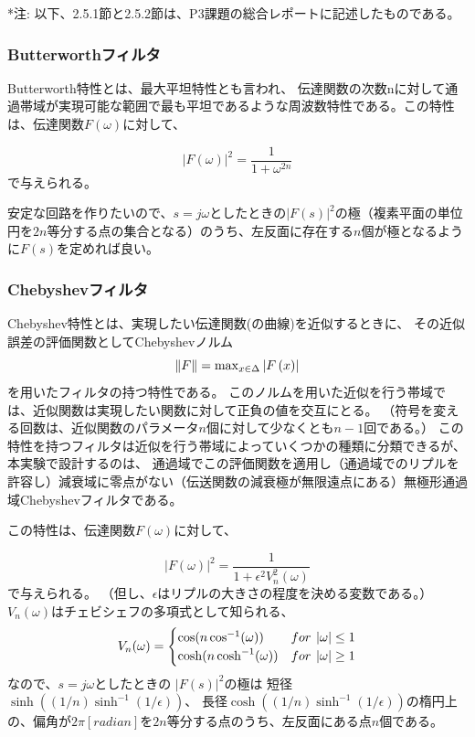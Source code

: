 \documentclass[10pt,a4j,dvipdfmx]{jsarticle}
\begin{document}
*注: 以下、2.5.1節と2.5.2節は、P3課題の総合レポートに記述したものである。
\subsubsection{Butterworthフィルタ}
Butterworth特性とは、最大平坦特性とも言われ、
伝達関数の次数nに対して通過帯域が実現可能な範囲で最も平坦であるような周波数特性である。この特性は、伝達関数$F(\omega)$に対して、

\begin{equation}
|F(\omega)|^{2} = \frac{1}{1+\omega^{2n}}
\end{equation}
で与えられる。

安定な回路を作りたいので、$s = j\omega$としたときの$|F(s)|^{2}$の極（複素平面の単位円を$2n$等分する点の集合となる）のうち、左反面に存在する$n$個が極となるように$F(s)$を定めれば良い。

\subsubsection{Chebyshevフィルタ}
Chebyshev特性とは、実現したい伝達関数(の曲線)を近似するときに、
その近似誤差の評価関数としてChebyshevノルム
\begin{equation}
\|F\| = {\rm max}_{x \in \Delta} \left|F\left( x \right)\right|
\end{equation}
を用いたフィルタの持つ特性である。
このノルムを用いた近似を行う帯域では、近似関数は実現したい関数に対して正負の値を交互にとる。
（符号を変える回数は、近似関数のパラメータ$n$個に対して少なくとも$n-1$回である。）
この特性を持つフィルタは近似を行う帯域によっていくつかの種類に分類できるが、
本実験で設計するのは、
通過域でこの評価関数を適用し（通過域でのリプルを許容し）減衰域に零点がない（伝送関数の減衰極が無限遠点にある）無極形通過域Chebyshevフィルタである。

この特性は、伝達関数$F(\omega)$に対して、

\begin{equation}
|F(\omega)|^{2} = \frac{1}{1+\epsilon^{2}V_{n}^{2}(\omega)}
\end{equation}
で与えられる。
（但し、$\epsilon$はリプルの大きさの程度を決める変数である。）	
$V_{n}(\omega)$はチェビシェフの多項式として知られる、
\begin{equation}
  V_{n}(\omega) = 
  \begin{cases}
    \cos(n\cos^{-1} (\omega)) & {\rm} for\hspace{4pt}|\omega|\leq 1 \\
    \cosh(n \cosh^{-1} (\omega)) & {\rm}  for\hspace{4pt}|\omega|\geq 1
  \end{cases}
\end{equation}
なので、$s = j\omega$としたときの
$|F(s)|^{2}$の極は
短径$\sinh\left( (1/n)\sinh^{-1}(1/\epsilon)\right) $、
長径$\cosh\left( (1/n)\sinh^{-1}(1/\epsilon)\right) $の楕円上の、偏角が$2\pi[\si{radian}]$を$2n$等分する点のうち、左反面にある点$n$個である。
\end{document}
